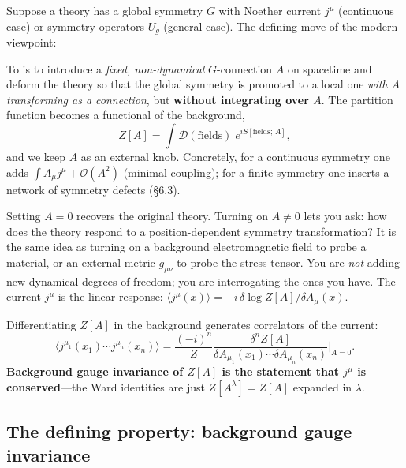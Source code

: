 \documentclass[11pt]{article}
\begin{document}
Suppose a theory has a global symmetry $G$ with Noether current $j^\mu$ (continuous
case) or symmetry operators $U_g$ (general case). The defining move of the modern
viewpoint:

\begin{ddefinition}
To  is to introduce a
\emph{fixed, non-dynamical} $G$-connection $A$ on spacetime and deform the theory so
that the global symmetry is promoted to a local one \emph{with $A$ transforming as a
connection}, but \textbf{without integrating over $A$}. The partition function becomes a
functional of the background,
\[
Z[A] = \int \mathcal{D}(\text{fields})\; e^{iS[\text{fields};\,A]},
\]
and we keep $A$ as an external knob. Concretely, for a continuous symmetry one adds
$\int A_\mu j^\mu + \mathcal O(A^2)$ (minimal coupling); for a finite symmetry one
inserts a network of symmetry defects (\S6.3).
\end{ddefinition}

\begin{iintuition}
Setting $A=0$ recovers the original theory. Turning on $A\neq 0$ lets you ask: how does
the theory respond to a position-dependent symmetry transformation? It is the same idea
as turning on a background electromagnetic field to probe a material, or an external
metric $g_{\mu\nu}$ to probe the stress tensor. You are \emph{not} adding new dynamical
degrees of freedom; you are interrogating the ones you have. The current $j^\mu$ is the
linear response: $\langle j^\mu(x)\rangle = -i\,\delta \log Z[A]/\delta A_\mu(x)$.
\end{iintuition}

\begin{eequation}
Differentiating $Z[A]$ in the background generates correlators of the current:
\[
\langle j^{\mu_1}(x_1)\cdots j^{\mu_n}(x_n)\rangle
= \frac{(-i)^n}{Z}\frac{\delta^n Z[A]}{\delta A_{\mu_1}(x_1)\cdots \delta A_{\mu_n}(x_n)}\bigg|_{A=0}.
\]
\textbf{Background gauge invariance of $Z[A]$ is the statement that $j^\mu$ is
conserved}---the Ward identities are just $Z[A^\lambda]=Z[A]$ expanded in $\lambda$.
\end{eequation}

\subsection{The defining property: background gauge invariance}
\end{document}
